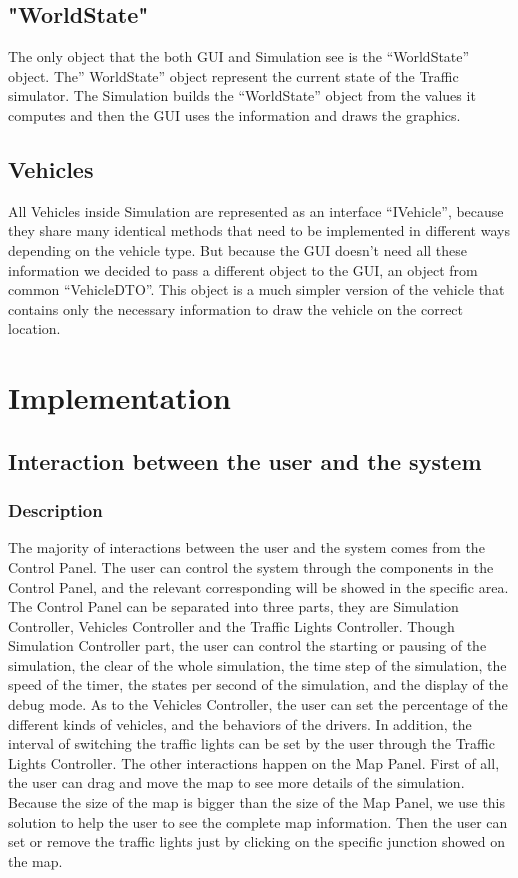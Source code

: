 \documentclass[a4paper,12pt]{article}
\begin{document}
 	\subsection{"WorldState"}
 	The only object that the both GUI and Simulation see is the “WorldState” object. The” WorldState” object represent the current state of the Traffic simulator. The Simulation builds the “WorldState” object from the values it computes and then the GUI uses the information and draws the graphics.
 	\subsection{Vehicles}
 	All Vehicles inside Simulation are represented as an interface “IVehicle”, because they share many identical methods that need to be implemented in different ways depending on the vehicle type. But because the GUI doesn’t need all these information we decided to pass a different object to the GUI, an object from common “VehicleDTO”. This object is a much simpler version of the vehicle that contains only the necessary information to draw the vehicle on the correct location.

\section{Implementation}
\subsection{Interaction between the user and the system}
\subsubsection{Description} The majority of interactions between the user and the system comes from the Control Panel. The user can control the system through the components in the Control Panel, and the relevant corresponding will be showed in the specific area. The Control Panel can be separated into three parts, they are Simulation Controller, Vehicles Controller and the Traffic Lights Controller. Though Simulation Controller part, the user can control the starting or pausing of the simulation, the clear of the whole simulation, the time step of the simulation, the speed of the timer, the states per second of the simulation, and the display of the debug mode. As to the Vehicles Controller, the user can set the percentage of the different kinds of vehicles, and the behaviors of the drivers. In addition, the interval of switching the traffic lights can be set by the user through the Traffic Lights Controller.
The other interactions happen on the Map Panel. First of all, the user can drag and move the map to see more details of the simulation. Because the size of the map is bigger than the size of the Map Panel, we use this solution to help the user to see the complete map information. Then the user can set or remove the traffic lights just by clicking on the specific junction showed on the map.
\end{document}

